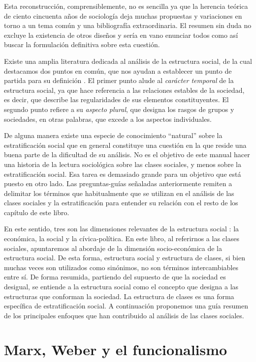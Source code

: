 \documentclass[
]{book}
\begin{document}
Esta reconstrucción, comprensiblemente, no es sencilla ya que la herencia teórica de ciento cincuenta años de sociología deja muchas propuestas y variaciones en torno a un tema común y una bibliografía extraordinaria. El resumen sin duda no excluye la existencia de otros diseños y sería en vano enunciar todos como así buscar la formulación definitiva sobre esta cuestión.

Existe una amplia literatura dedicada al análisis de la estructura social, de la cual destacamos dos puntos en común, que nos ayudan a establecer un punto de partida para su definición \citep{FeitoAlonso1995}. El primer punto alude al \emph{carácter temporal} de la estructura social, ya que hace referencia a las relaciones estables de la sociedad, es decir, que describe las regularidades de sus elementos constituyentes. El segundo punto refiere a su \emph{aspecto plural}, que designa los rasgos de grupos y sociedades, en otras palabras, que excede a los aspectos individuales.

De alguna manera existe una especie de conocimiento ``natural'' sobre la estratificación social que en general constituye una cuestión en la que reside una buena parte de la dificultad de su análisis. No es el objetivo de este manual hacer una historia de la lectura sociológica sobre las clases sociales, y menos sobre la estratificación social. Esa tarea es demasiado grande para un objetivo que está puesto en otro lado. Las preguntas-guías señaladas anteriormente remiten a delimitar los términos que habitualmente que se utilizan en el análisis de las clases sociales y la estratificación para entender su relación con el resto de los capítulo de este libro.

En este sentido, tres son las dimensiones relevantes de la estructura social \citep{Carabana1997}: la económica, la social y la cívica-política. En este libro, al referirnos a las clases sociales, apuntaremos al abordaje de la dimensión socio-económica de la estructura social. De esta forma, estructura social y estructura de clases, si bien muchas veces son utilizados como sinónimos, no son términos intercambiables entre sí. De forma resumida, partiendo del supuesto de que la sociedad es desigual, se entiende a la estructura social como el concepto que designa a las estructuras que conforman la sociedad. La estructura de clases es una forma específica de estratificación social. A continuación proponemos una guía resumen de los principales enfoques que han contribuido al análisis de las clases sociales.

\hypertarget{marx}{%
\section{Marx, Weber y el funcionalismo}\label{marx}}
\end{document}
